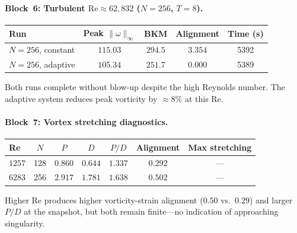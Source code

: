 \paragraph{Block~6: Turbulent $\mathrm{Re} \approx 62{,}832$
($N = 256$, $T = 8$).}
\begin{center}
\begin{tabular}{@{}lcccc@{}}
\toprule
Run & Peak $\|\omega\|_\infty$ & BKM & Alignment & Time (s)\\
\midrule
$N=256$, constant & $115.03$ & $294.5$ & $3.354$ & 5392\\
$N=256$, adaptive & $105.34$ & $251.7$ & $0.000$ & 5389\\
\bottomrule
\end{tabular}
\end{center}
Both runs complete without blow-up despite the high Reynolds
number.  The adaptive system reduces peak vorticity by $\approx 8\%$
at this Re.

\paragraph{Block~7: Vortex stretching diagnostics.}
\begin{center}
\begin{tabular}{@{}lcccccc@{}}
\toprule
Re & $N$ & $P$ & $D$ & $P/D$ & Alignment & Max stretching\\
\midrule
$1257$ & 128 & $0.860$ & $0.644$ & $1.337$ & $0.292$ & ---\\
$6283$ & 256 & $2.917$ & $1.781$ & $1.638$ & $0.502$ & ---\\
\bottomrule
\end{tabular}
\end{center}
Higher Re produces higher vorticity-strain alignment ($0.50$
vs.\ $0.29$) and larger $P/D$ at the snapshot, but both
remain finite---no indication of approaching singularity.


